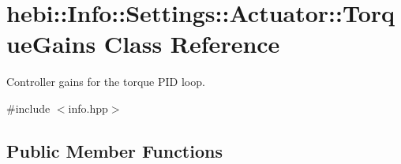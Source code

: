 \hypertarget{classhebi_1_1Info_1_1Settings_1_1Actuator_1_1TorqueGains}{}\section{hebi\+:\+:Info\+:\+:Settings\+:\+:Actuator\+:\+:Torque\+Gains Class Reference}
\label{classhebi_1_1Info_1_1Settings_1_1Actuator_1_1TorqueGains}


Controller gains for the torque P\+ID loop.  




{\ttfamily \#include $<$info.\+hpp$>$}

\subsection*{Public Member Functions}
